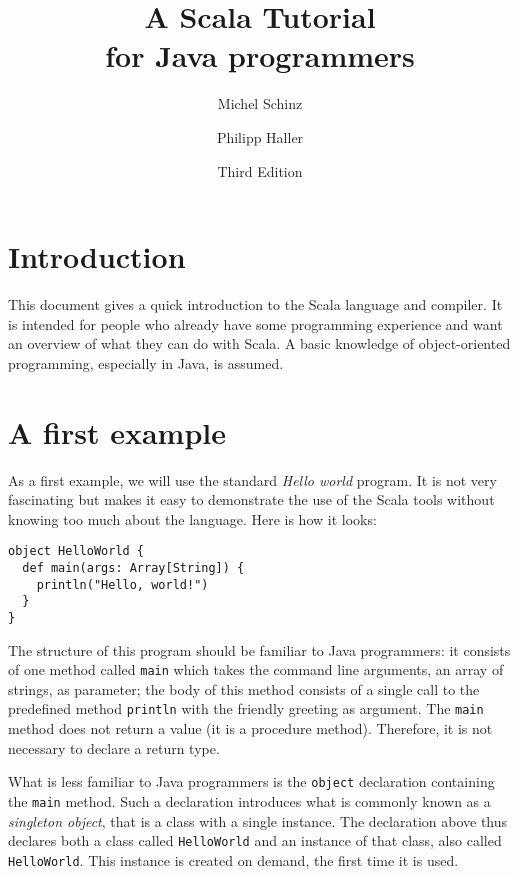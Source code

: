 \documentclass[a4paper,12pt,twoside,titlepage]{article}
\begin{document}
\title{A Scala Tutorial \\\large for Java programmers}
\author{Michel Schinz \and Philipp Haller}
\date{Third Edition}
\maketitle

\section*{Introduction}
\label{sec:introduction}

This document gives a quick introduction to the Scala language and
compiler. It is intended for people who already have some programming
experience and want an overview of what they can do with Scala. A
basic knowledge of object-oriented programming, especially in Java,
is assumed.

\section{A first example}
\label{sec:first-example}

As a first example, we will use the standard \emph{Hello world}
program. It is not very fascinating but makes it easy to demonstrate
the use of the Scala tools without knowing too much about the
language. Here is how it looks:
\begin{lstlisting}
object HelloWorld {
  def main(args: Array[String]) {
    println("Hello, world!")
  }
}
\end{lstlisting}

The structure of this program should be familiar to Java programmers:
it consists of one method called \lstinline?main? which takes the command
line arguments, an array of strings, as parameter; the body of this
method consists of a single call to the predefined method \lstinline?println?
with the friendly greeting as argument. The \lstinline?main? method does not
return a value (it is a procedure method). Therefore, it is not necessary
to declare a return type.

What is less familiar to Java programmers is the \lstinline?object?
declaration containing the \lstinline?main? method. Such a declaration
introduces what is commonly known as a \emph{singleton object}, that
is a class with a single instance. The declaration above thus declares
both a class called \lstinline?HelloWorld? and an instance of that class,
also called \lstinline?HelloWorld?. This instance is created on demand,
the first time it is used.
\end{document}
